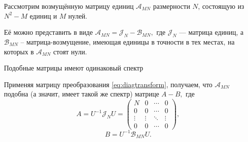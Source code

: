 Рассмотрим возмущённую матрицу единиц
\( \mathscr{A}_{MN} \) размерности \( N \),
состоящую из \( N^2 - M \) единиц и \( M \) нулей.

Её можно представить в виде
\(
    \mathscr{A}_{MN} = \mathscr{J}_{N} - \mathscr{B}_{MN},
    \)
где \( \mathscr{J}_{N} \) --- матрица единиц,
а \( \mathscr{B}_{MN} \) -- матрица-возмущение,
имеющая единицы в точности в тех местах,
на которых в \( \mathscr{A}_{MN} \) стоят нули.

\begin{prop}
    Подобные матрицы имеют одинаковый спектр
\end{prop}

Применяя матрицу преобразования \eqref{eq:diagtransform},
получаем, что \( \mathscr{A}_{MN} \) подобна (а значит, имеет такой же спектр)
матрице
\( A - B, \)
где
\[
    A = {U^{-1}}{\mathscr{J}_{N}}{U}
    = \begin{pmatrix}
      N      & 0      & \cdots & 0 \\
      0      & 0      & \cdots & 0 \\
      \vdots & \vdots & \ddots & \vdots \\
      0      & 0      & \cdots & 0
        \end{pmatrix},
        \]
\[
    B = {U^{-1}}{\mathscr{B}_{MN}}{U}.
    \]
